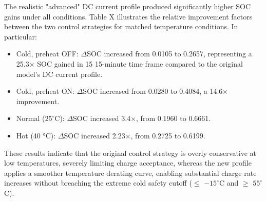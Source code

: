 \documentclass[conference]{IEEEtran}
\begin{document}
\begin{table}[h]
\centering
\caption{SOC Performance Across Temperature, Control, and Preheating Conditions}
\scriptsize
\setlength{\tabcolsep}{3pt}
\end{table}

The realistic "advanced" DC current profile produced significantly higher SOC gains under all conditions. Table X illustrates the relative improvement factors between the two control strategies for matched temperature conditions. In particular:
\begin{itemize}
    \item Cold, preheat OFF: $\Delta$SOC increased from 0.0105 to 0.2657, representing a 25.3× SOC gained in 15 15-minute time frame compared to the original model's DC current profile.
    \item Cold, preheat ON: $\Delta$SOC increased from 0.0280 to 0.4084, a 14.6× improvement.
    \item Normal ($25^\circ$C): $\Delta$SOC increased 3.4×, from 0.1960 to 0.6661.
    \item Hot (40 °C): $\Delta$SOC increased 2.23×, from 0.2725 to 0.6199.
\end{itemize}
These results indicate that the original control strategy is overly conservative at low temperatures, severely limiting charge acceptance, whereas the new profile applies a smoother temperature derating curve, enabling substantial charge rate increases without breaching the extreme cold safety cutoff ($\leq$ $-15^\circ$C and $\geq$ $55^\circ$C).
\end{document}

